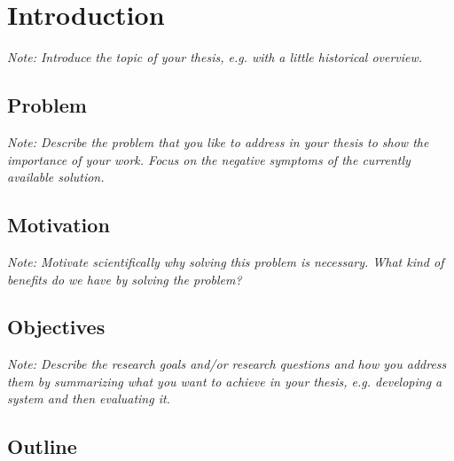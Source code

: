 \documentclass[a4paper,12pt,twoside]{report}
\begin{document}
\clearpage



\tableofcontents
\clearpage

\clearpage

\begin{acronym}

\end{acronym}


\fancyhead{}
\pagestyle{fancy}
\fancyhead[LE]{\slshape \leftmark}
\fancyhead[RO]{\slshape \rightmark}
\headheight=15pt





\chapter{Introduction}

\textit{Note: Introduce the topic of your thesis, e.g. with a little historical overview.}

\section{Problem}

\textit{Note: Describe the problem that you like to address in your thesis to show the importance of your work. Focus on the negative symptoms of the currently available solution.}

\section{Motivation}

\textit{Note: Motivate scientifically why solving this problem is necessary. What kind of benefits do we have by solving the problem?}

\section{Objectives}

\textit{Note: Describe the research goals and/or research questions and how you address them by summarizing what you want to achieve in your thesis, e.g. developing a system and then evaluating it.}

\section{Outline}
\end{document}
